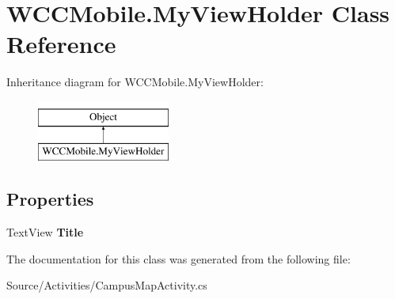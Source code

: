 \hypertarget{class_w_c_c_mobile_1_1_my_view_holder}{}\section{W\+C\+C\+Mobile.\+My\+View\+Holder Class Reference}
\label{class_w_c_c_mobile_1_1_my_view_holder}
Inheritance diagram for W\+C\+C\+Mobile.\+My\+View\+Holder\+:\begin{figure}[H]
\begin{center}
\leavevmode
\includegraphics[height=2.000000cm]{class_w_c_c_mobile_1_1_my_view_holder}
\end{center}
\end{figure}
\subsection*{Properties}
\begin{DoxyCompactItemize}
\item 
Text\+View {\bfseries Title}\hypertarget{class_w_c_c_mobile_1_1_my_view_holder_a91999c3811bee5137a73e95fc3ae6e52}{}\label{class_w_c_c_mobile_1_1_my_view_holder_a91999c3811bee5137a73e95fc3ae6e52}

\end{DoxyCompactItemize}


The documentation for this class was generated from the following file\+:\begin{DoxyCompactItemize}
\item 
Source/\+Activities/Campus\+Map\+Activity.\+cs\end{DoxyCompactItemize}
